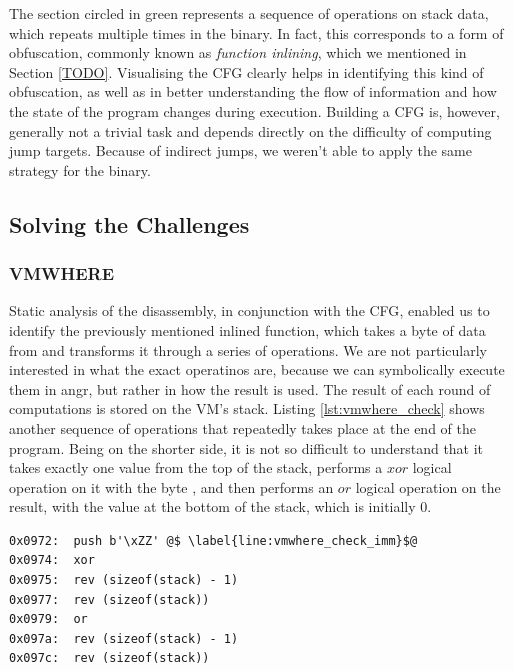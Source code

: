 The section circled in green represents a sequence of operations on stack data, which repeats multiple times in the binary. In fact, this corresponds to a form of obfuscation, commonly known as \emph{function inlining}, which we mentioned in Section \ref{TODO}. Visualising the \gls{CFG} clearly helps in identifying this kind of obfuscation, as well as in better understanding the flow of information and how the state of the program changes during execution. Building a \gls{CFG} is, however, generally not a trivial task and depends directly on the difficulty of computing jump targets. Because of indirect jumps, we weren't able to apply the same strategy for the  binary.

\subsection{Solving the Challenges}

\subsubsection{VMWHERE}

Static analysis of the disassembly, in conjunction with the \gls{CFG}, enabled us to identify the previously mentioned inlined function, which takes a byte of data from  and transforms it through a series of operations. We are not particularly interested in what the exact operatinos are, because we can symbolically execute them in angr, but rather in how the result is used. The result of each round of computations is stored on the \gls{VM}'s stack. Listing \ref{lst:vmwhere_check} shows another sequence of operations that repeatedly takes place at the end of the program. Being on the shorter side, it is not so difficult to understand that it takes exactly one value from the top of the stack, performs a $xor$ logical operation on it with the byte \cc{\xZZ}, and then performs an $or$ logical operation on the result, with the value at the bottom of the stack, which is initially $0$.

\begin{lstlisting}[label={lst:vmwhere_check}, caption={TODO}]
0x0972:  push b'\xZZ' @$ \label{line:vmwhere_check_imm}$@
0x0974:  xor
0x0975:  rev (sizeof(stack) - 1)
0x0977:  rev (sizeof(stack))
0x0979:  or
0x097a:  rev (sizeof(stack) - 1)
0x097c:  rev (sizeof(stack))
\end{lstlisting}

